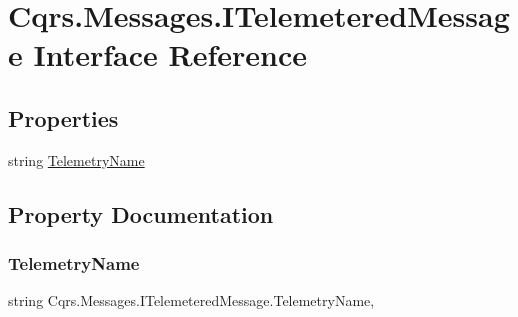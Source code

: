 \hypertarget{interfaceCqrs_1_1Messages_1_1ITelemeteredMessage}{}\section{Cqrs.\+Messages.\+I\+Telemetered\+Message Interface Reference}
\label{interfaceCqrs_1_1Messages_1_1ITelemeteredMessage}
\subsection*{Properties}
\begin{DoxyCompactItemize}
\item 
string \hyperlink{interfaceCqrs_1_1Messages_1_1ITelemeteredMessage_af8106e5bc763e16284567c334b733733_af8106e5bc763e16284567c334b733733}{Telemetry\+Name}
\end{DoxyCompactItemize}


\subsection{Property Documentation}
\mbox{\label{interfaceCqrs_1_1Messages_1_1ITelemeteredMessage_af8106e5bc763e16284567c334b733733_af8106e5bc763e16284567c334b733733}} 
\subsubsection{\texorpdfstring{Telemetry\+Name}{TelemetryName}}
{\footnotesize\ttfamily string Cqrs.\+Messages.\+I\+Telemetered\+Message.\+Telemetry\+Name\hspace{0.3cm}{\ttfamily [get]}, {\ttfamily [set]}}

